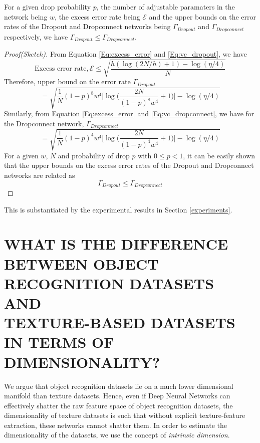 \documentclass[11pt,a4paper]{article}
\begin{document}
\begin{theorem}\label{Theorem:dropout_dropconnect}
For a given drop probability $p$, the number of adjustable paramaters in the network being $w$, the excess error rate being $\mathcal{E}$ and the upper bounds on the error rates of the Dropout and Dropconnect networks being ${\Gamma}_{Dropout}$ and ${\Gamma}_{Dropconnect}$ respectively, we have ${\Gamma}_{Dropout} \leq {\Gamma}_{Dropconnect}$.
\end{theorem}
\begin{proof}[Proof(Sketch)] From Equation \ref{Eq:excess_error} and \ref{Eq:vc_dropout}, we have
\begin{equation}
\text{Excess error rate}, \mathcal{E} \leq \sqrt{\frac{h(\log(2N/h)+1)-\log(\eta/4)}{N}}
\end{equation}
Therefore, upper bound on the error rate ${\Gamma}_{Dropout} $
\begin{equation}
= \sqrt{\frac{1}{N}(1-p)^8w^4\Big[\log\Big(\frac{2N}{(1-p)^8w^4}+1\Big)\Big] - \log(\eta/4) }
\end{equation}
Similarly, from Equation \ref{Eq:excess_error} and \ref{Eq:vc_dropconnect}, we have for the Dropconnect network,
 ${\Gamma}_{Dropconnect}$
\begin{equation}
 = \sqrt{\frac{1}{N}(1-p)^4w^4\Big[\log\Big(\frac{2N}{(1-p)^4w^4}+1\Big)\Big] - \log(\eta/4) }
\end{equation}
For a given $w$, $N$ and probability of drop $p$ with $0 \leq p < 1$, it can be easily shown that the upper bounds on the excess error rates of the Dropout and Dropconnect networks are related as
\begin{equation}{\Gamma}_{Dropout} \leq {\Gamma}_{Dropconnect}
\end{equation}
\end{proof}
This is substantiated by the experimental results in Section \ref{experiments}.

\section{WHAT IS THE DIFFERENCE BETWEEN OBJECT RECOGNITION DATASETS AND \\ TEXTURE-BASED DATASETS IN TERMS OF DIMENSIONALITY?}\label{section:object_recognition_vs_texture}  
We argue that object recognition datasets lie on a much lower dimensional manifold than texture datasets. Hence, even if Deep Neural Networks can effectively shatter the raw feature space of object recognition datasets, the dimensionality of texture datasets is such that without explicit texture-feature extraction, these networks cannot shatter them. In order to estimate the dimensionality of the datasets, we use the concept of \emph{intrinsic dimension}\cite{MLE04}. 
\end{document}
